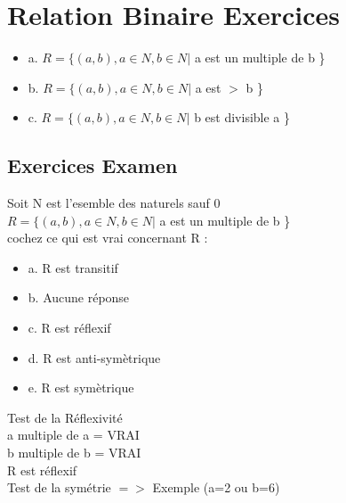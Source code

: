 \newpage

\section{Relation Binaire Exercices}
\vspace{5mm} %

\begin{itemize}
\item {a. $R=\{(a,b), a ∈ N, b ∈ N | $ a est un multiple de b \} }
\item {b. $R=\{(a,b), a ∈ N, b ∈ N |$ a est $>$ b \} }
\item {c. $R=\{(a,b), a ∈ N, b ∈ N |$ b est divisible a \} }
\end{itemize}

\subsection{Exercices Examen}
\vspace{3mm} %

Soit N est l’esemble des naturels sauf 0 \\
$R=\{(a,b), a ∈ N, b ∈ N | $ a est un multiple de b \} \\

\vspace{3mm} %
cochez ce qui est vrai concernant R : \\

\begin{itemize}[label=$\square$]
\item {a. R est transitif}
\item {b. Aucune réponse}
\item {c. R est réflexif}
\item {d. R est anti-symètrique}
\item {e. R est symètrique}
\end{itemize}

\vspace{5mm} %

Test de la Réflexivité \\

a multiple de a = VRAI \\
b multiple de b = VRAI \\
R est réflexif \\

Test de la symétrie $=>$ Exemple (a=2 ou b=6) \\

